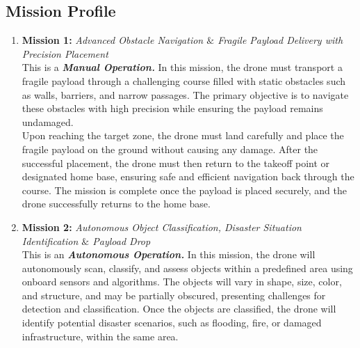 \documentclass[12pt]{report}
\begin{document}
    \subsection{Mission Profile}
    \begin{enumerate}
      \item \textbf{Mission 1:} \textit{Advanced Obstacle Navigation $\&$ Fragile Payload Delivery with Precision Placement} \\
        This is a \textbf{\textit{Manual Operation.}} In this mission, the drone must transport a fragile payload through a challenging course filled with static obstacles such as walls, barriers, and narrow passages. The primary objective is to navigate these obstacles with high precision while ensuring the payload remains undamaged. \\
        
        Upon reaching the target zone, the drone must land carefully and place the fragile payload on the ground without causing any damage. After the successful placement, the drone must then return to the takeoff point or designated home base, ensuring safe and efficient navigation back through the course. The mission is complete once the payload is placed securely, and the drone successfully returns to the home base.
      \item \textbf{Mission 2:} \textit{Autonomous Object Classification, Disaster Situation Identification $\&$ Payload Drop }\\
        This is an \textbf{\textit{Autonomous Operation.}} In this mission, the drone will autonomously scan, classify, and assess objects within a predefined area using onboard sensors and algorithms. The objects will vary in shape, size, color, and structure, and may be partially obscured, presenting challenges for detection and classification. Once the objects are classified, the drone will identify potential disaster scenarios, such as flooding, fire, or damaged infrastructure, within the same area.
    \end{enumerate}
\end{document}
